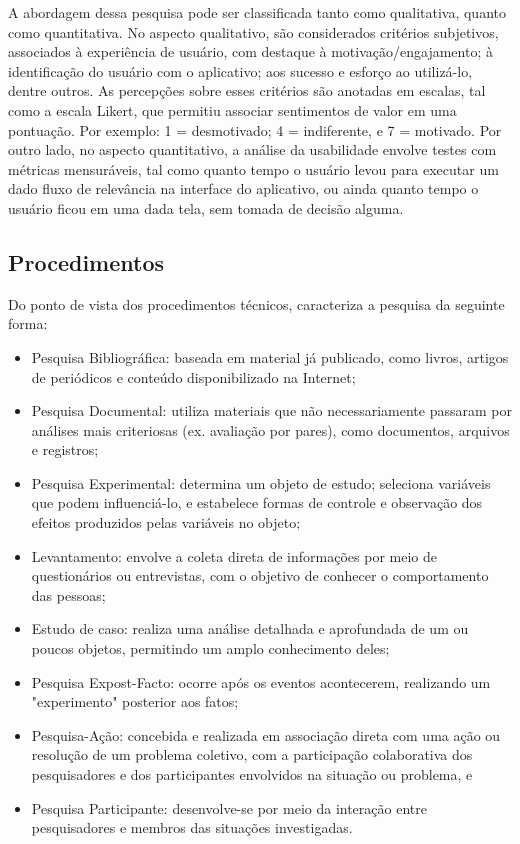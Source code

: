 A abordagem dessa pesquisa pode ser classificada tanto como qualitativa, quanto como quantitativa. No aspecto qualitativo, são considerados critérios subjetivos, associados à experiência de usuário, com destaque à motivação/engajamento; à identificação 
do usuário com o aplicativo; aos sucesso e esforço ao utilizá-lo, dentre outros. As percepções sobre esses critérios são anotadas em escalas, tal como a escala Likert, que permitiu associar sentimentos de valor em uma pontuação. Por exemplo: 1 = desmotivado; 
4 = indiferente, e 7 = motivado. Por outro lado, no aspecto quantitativo, a análise da usabilidade envolve testes com métricas mensuráveis, tal como quanto tempo o usuário levou para executar um dado fluxo de relevância na interface do aplicativo, ou ainda 
quanto tempo o usuário ficou em uma dada tela, sem tomada de decisão alguma.

\subsection{Procedimentos}
\label{sec:Procedimentos}
Do ponto de vista dos procedimentos técnicos,  caracteriza a pesquisa da seguinte forma:

\begin{itemize}
	\item Pesquisa Bibliográfica: baseada em material já publicado, como livros, artigos de periódicos e conteúdo disponibilizado na Internet;
	\item Pesquisa Documental: utiliza materiais que não necessariamente passaram por análises mais criteriosas (ex. avaliação por pares), como documentos, arquivos e registros;
	\item Pesquisa Experimental: determina um objeto de estudo; seleciona variáveis que podem influenciá-lo, e estabelece formas de controle e observação dos efeitos produzidos pelas variáveis no objeto;
	\item Levantamento: envolve a coleta direta de informações por meio de questionários ou entrevistas, com o objetivo de conhecer o comportamento das pessoas;
	\item Estudo de caso: realiza uma análise detalhada e aprofundada de um ou poucos objetos, permitindo um amplo conhecimento deles;
	\item Pesquisa Expost-Facto: ocorre após os eventos acontecerem, realizando um "experimento" \newline	
	posterior aos fatos;
	\item Pesquisa-Ação: concebida e realizada em associação direta com uma ação ou resolução de um problema coletivo, com a participação colaborativa dos pesquisadores e dos participantes envolvidos na situação ou problema, e
	\item Pesquisa Participante: desenvolve-se por meio da interação entre pesquisadores e membros das situações investigadas.
\end{itemize}

